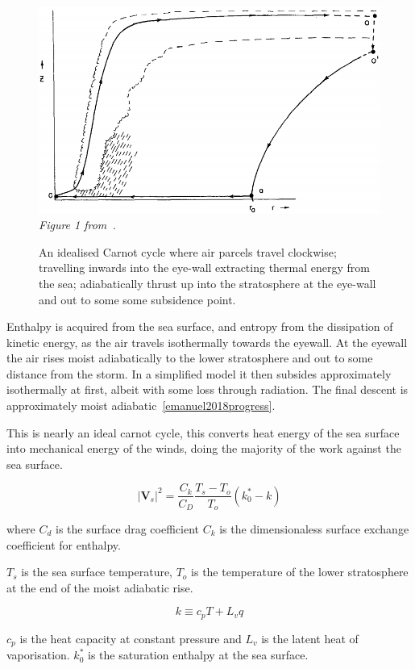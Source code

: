 \begin{figure}
\centering
    \includegraphics[width=\linewidth]{images/hurricane-carnot.png}\\
    \textit{Figure 1 from~\cite{emanuel1991theory}. }
    \caption{An idealised Carnot cycle where air parcels travel clockwise;
            travelling inwards into the eye-wall extracting thermal energy
            from the sea; adiabatically thrust up into the stratosphere
            at the eye-wall and out to some some subsidence point. }
            \label{fig:hurricane-carnot}

\end{figure}


Enthalpy is acquired from the sea surface,
and entropy from the dissipation of kinetic energy,
 as the air travels isothermally towards the eyewall.
 At the eyewall the air rises moist adiabatically
 to the lower stratosphere and out to some distance from the storm.
 In a simplified model it then subsides
 approximately isothermally at first, albeit with some loss through radiation.
 The final descent is approximately moist adiabatic~\ref{emanuel2018progress}.

This is nearly an ideal carnot cycle, this converts heat energy of the sea surface into
mechanical energy of the winds, doing the majority of the work against the sea surface.

\begin{equation}
\left|\mathbf{V}_{s}\right|^{2}=\frac{C_{k}}{C_{D}} \frac{T_{s}-T_{o}}{T_{o}}\left(k_{0}^{*}-k\right)
\tag{PI}
\label{eq:PI}
\end{equation}

where $C_d$ is the surface drag coefficient $C_k$ is the dimensionaless
surface exchange coefficient for enthalpy.

$T_s$ is the sea surface temperature, $T_o$ is the temperature of the
lower stratosphere at the end of the moist adiabatic rise.

\begin{equation}
k \equiv c_{p} T+L_{v} q
\end{equation}

$c_p$ is the heat capacity at constant pressure and $L_{v}$ is the latent heat
of vaporisation. $k_{0}^{*}$ is the saturation enthalpy at the sea surface.

